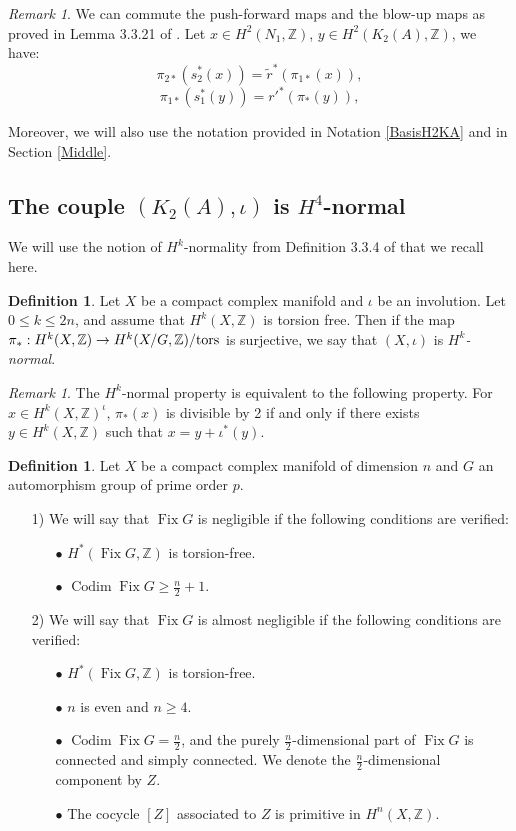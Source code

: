 \documentclass{alggeom}
\DeclareMathOperator{\Fix}{Fix}
\DeclareMathOperator{\codim}{Codim}
\newcommand{\tors}{{\rm{tors}}}
\newcommand{\Z}{\mathbb{Z}}
\theoremstyle{plain}
\theoremstyle{definition}
\newtheorem{defi}[theorem]{Definition}
\theoremstyle{remark}
\newtheorem{rmk}[theorem]{Remark}
\begin{document}
\begin{rmk}\label{commut2}
We can commute the push-forward maps and the blow-up maps as proved in Lemma 3.3.21 of \cite{Lol}.
Let $x\in H^{2}(N_1,\Z)$, $y\in H^{2}(K_2(A),\Z)$, we have:
$$\pi_{2*}(s_2^{*}(x))=\widetilde{r}^{*}(\pi_{1*}(x)),$$
$$\pi_{1*}(s_1^{*}(y))=r'^{*}(\pi_{*}(y)),$$
\end{rmk}
Moreover, we will also use the notation provided in Notation \ref{BasisH2KA} and in Section \ref{Middle}.
\subsection{The couple $(K_{2}(A),\iota)$ is $H^{4}$-normal}\label{H4}
We will use the notion of $H^k$-normality from Definition 3.3.4 of \cite{Lol} that we recall here.
\begin{defi}
Let $X$ be a compact complex manifold and $\iota$ be an involution. 
Let $0\leq k\leq 2n$, and assume that $H^{k}(X,\Z)$ is torsion free. 
Then if the map $\pi_{*}:H^{k}(X,\Z)\rightarrow H^{k}(X/G,\Z)/\tors$ is surjective, we say that $(X,\iota)$ is \emph{$H^{k}$-normal}.
\end{defi}
\begin{rmk}\label{Hnormal}
The $H^{k}$-normal property is equivalent to the following property.
For $x\in H^{k}(X,\Z)^{\iota}$, $\pi_{*}(x)$ is divisible by 2 if and only if there exists $y\in H^{k}(X,\Z)$ such that 
$x=y+\iota^{*}(y)$.
\end{rmk}
\begin{defi}\label{negligible}
Let $X$ be a compact complex manifold of dimension $n$ and $G$ an automorphism group of prime order $p$. 
\begin{itemize}
\item[1)]
We will say that $\Fix G$ is negligible if the following conditions are verified:
\begin{itemize}
\item[$\bullet$]
$H^{*}(\Fix G,\Z)$ is torsion-free.
\item[$\bullet$]
$\codim \Fix G\geq \frac{n}{2}+1$.
\end{itemize}
\item[2)]
We will say that $\Fix G$ is almost negligible if the following conditions are verified:
\begin{itemize}
\item[$\bullet$]
$H^{*}(\Fix G,\Z)$ is torsion-free.
\item[$\bullet$]
$n$ is even and $n\geq 4$.
\item[$\bullet$]
$\codim \Fix G =\frac{n}{2}$, and the purely $\frac{n}{2}$-dimensional part of $\Fix G$ is connected and simply connected. We denote the $\frac{n}{2}$-dimensional component by $Z$.
\item[$\bullet$]
The cocycle $\left[Z\right]$ associated to $Z$ is primitive in $H^{n}(X,\Z)$.
\end{itemize}
\end{itemize}
\end{defi}
\end{document}
